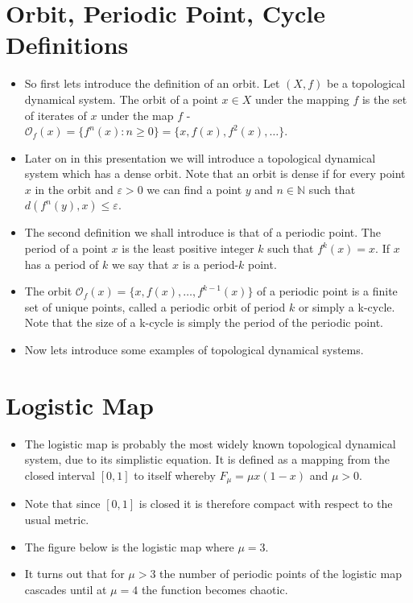 \documentclass{article}
\begin{document}
    \section{Orbit, Periodic Point, Cycle Definitions}
    \begin{itemize}
        \item So first lets introduce the definition of an orbit. Let $(X, f)$ be a topological dynamical system. The orbit of a point $x \in X$ under the mapping $f$ is the set of iterates of $x$ under the map $f$ - $\mathcal{O}_f(x) = \lbrace f^n(x) : n \geq 0 \rbrace = \lbrace x, f(x), f^2(x), \dots \rbrace$. 
        \item Later on in this presentation we will introduce a topological dynamical system which has a dense orbit. Note that an orbit is dense if for every point $x$ in the orbit and $\varepsilon > 0$ we can find a point $y$ and $n \in \mathbb{N}$ such that $d(f^n(y), x) \leq \varepsilon$.
        \item The second definition we shall introduce is that of a periodic point. The period of a point $x$ is the least positive integer $k$ such that $f^k(x) = x$. If $x$ has a period of $k$ we say that $x$ is a period-$k$ point.
        \item The orbit $\mathcal{O}_f(x) = \lbrace x, f(x), \dots, f^{k-1}(x) \rbrace$ of a periodic point is a finite set of unique points, called a periodic orbit of period $k$ or simply a k-cycle. Note that the size of a k-cycle is simply the period of the periodic point.
        \item Now lets introduce some examples of topological dynamical systems.
    \end{itemize}

    \section{Logistic Map}
    \begin{itemize}
        \item The logistic map is probably the most widely known topological dynamical system, due to its simplistic equation. It is defined as a mapping from the closed interval $[0, 1]$ to itself whereby $F_\mu = \mu x (1 - x)$ and $\mu > 0$.
        \item Note that since $[0, 1]$ is closed it is therefore compact with respect to the usual metric. 
        \item The figure below is the logistic map where $\mu = 3$.
        \item It turns out that for $\mu > 3$ the number of periodic points of the logistic map cascades until at $\mu = 4$ the function becomes chaotic.
    \end{itemize}
\end{document}

